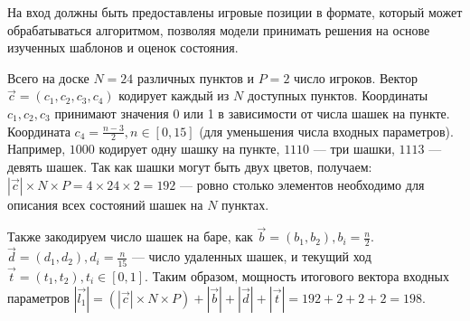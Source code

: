На вход должны быть предоставлены игровые позиции в формате, который может обрабатываться алгоритмом, позволяя модели принимать решения на основе изученных шаблонов и оценок состояния.

Всего на доске $N = 24$ различных пунктов и $P = 2$ число игроков. Вектор $\vec{c} = (c_1, c_2, c_3, c_4)$ кодирует каждый из $N$ доступных пунктов. Координаты $c_1, c_2, c_3$ принимают значения 0 или 1 в зависимости от числа шашек на пункте. Координата $c_4 = \frac{n - 3}{2}, n \in [0, 15]$ (для уменьшения числа входных параметров). Например, $1000$ кодирует одну шашку на пункте, $1110$ --- три шашки, $1113$ --- девять шашек. Так как шашки могут быть двух цветов, получаем: $|\vec{c}| \times N \times P = 4 \times 24 \times 2 = 192$ — ровно столько элементов необходимо для описания всех состояний шашек на $N$ пунктах.

Также закодируем число шашек на баре, как $\vec{b} = (b_1, b_2), b_i = \frac{n}{2}$. $\vec{d} = (d_1, d_2),  d_i = \frac{n}{15}$ --- число удаленных шашек, и текущий ход $\vec{t} = (t_1, t_2), t_i \in [0, 1]$. Таким образом, мощность итогового вектора входных параметров $|\vec{l_1}| = (|\vec{c}| \times N \times P) + |\vec{b}| + |\vec{d}| + |\vec{t}| = 192 + 2 + 2 + 2 = 198$.
